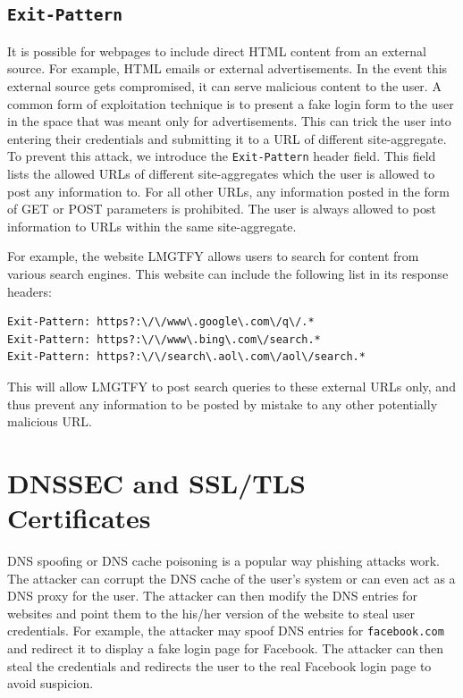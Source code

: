 \subsection{\texttt{Exit-Pattern}}

It is possible for webpages to include direct HTML content from an external source. For example, HTML emails or external advertisements. In the event this external source gets compromised, it can serve malicious content to the user. A common form of exploitation technique is to present a fake login form to the user in the space that was meant only for advertisements. This can trick the user into entering their credentials and submitting it to a URL of different site-aggregate. To prevent this attack, we introduce the {\tt Exit-Pattern} header field. This field lists the allowed URLs of different site-aggregates which the user is allowed to post any information to. For all other URLs, any information posted in the form of GET or POST parameters is prohibited. The user is always allowed to post information to URLs within the same site-aggregate.

For example, the website LMGTFY allows users to search for content from various search engines. This website can include the following list in its response headers:

\begin{verbatim}
Exit-Pattern: https?:\/\/www\.google\.com\/q\/.*
Exit-Pattern: https?:\/\/www\.bing\.com\/search.*
Exit-Pattern: https?:\/\/search\.aol\.com\/aol\/search.*
\end{verbatim}

This will allow LMGTFY to post search queries to these external URLs only, and thus prevent any information to be posted by mistake to any other potentially malicious URL.

\section{DNSSEC and SSL/TLS Certificates}

DNS spoofing or DNS cache poisoning is a popular way phishing attacks work. The attacker can corrupt the DNS cache of the user's system or can even act as a DNS proxy for the user. The attacker can then modify the DNS entries for websites and point them to the his/her version of the website to steal user credentials. For example, the attacker may spoof DNS entries for {\tt facebook.com} and redirect it to display a fake login page for Facebook. The attacker can then steal the credentials and redirects the user to the real Facebook login page to avoid suspicion.

